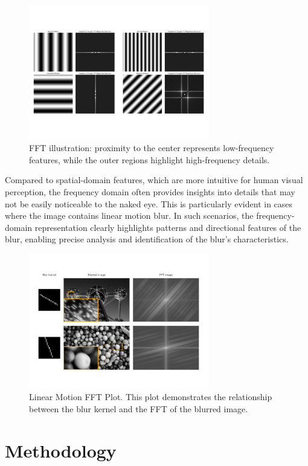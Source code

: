 \documentclass[twoside,11pt]{article}
\begin{document}
\begin{figure}[H]
\centering
\includegraphics[width=0.7\textwidth]{figure3.jpg}
\caption{FFT illustration: proximity to the center represents low-frequency features, while the outer regions highlight high-frequency details.}
\end{figure}

Compared to spatial-domain features, which are more intuitive for human visual perception, the frequency domain often provides insights into details that may not be easily noticeable to the naked eye. This is particularly evident in cases where the image contains linear motion blur. In such scenarios, the frequency-domain representation clearly highlights patterns and directional features of the blur, enabling precise analysis and identification of the blur’s characteristics.

\begin{figure}[H]
\centering
\includegraphics[width=0.7\textwidth]{figure4.jpg}
\caption{Linear Motion FFT Plot. This plot demonstrates the relationship between the blur kernel and the FFT of the blurred image.}
\end{figure}


\section{Methodology}
\end{document}
